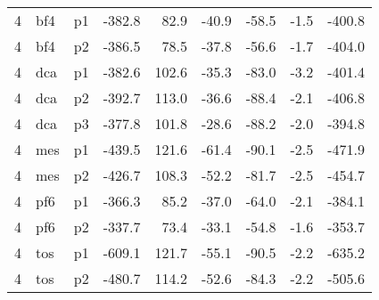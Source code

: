 \documentclass[a4paper]{article}
\begin{document}
\begin{table}[ht]
\begin{tabular}{rllrrrrrr}
   4 & bf4 & p1 & -382.8 & 82.9 & -40.9 & -58.5 & -1.5 & -400.8 \\ 
   4 & bf4 & p2 & -386.5 & 78.5 & -37.8 & -56.6 & -1.7 & -404.0 \\ 
   4 & dca & p1 & -382.6 & 102.6 & -35.3 & -83.0 & -3.2 & -401.4 \\ 
   4 & dca & p2 & -392.7 & 113.0 & -36.6 & -88.4 & -2.1 & -406.8 \\ 
   4 & dca & p3 & -377.8 & 101.8 & -28.6 & -88.2 & -2.0 & -394.8 \\ 
   4 & mes & p1 & -439.5 & 121.6 & -61.4 & -90.1 & -2.5 & -471.9 \\ 
   4 & mes & p2 & -426.7 & 108.3 & -52.2 & -81.7 & -2.5 & -454.7 \\ 
   4 & pf6 & p1 & -366.3 & 85.2 & -37.0 & -64.0 & -2.1 & -384.1 \\ 
   4 & pf6 & p2 & -337.7 & 73.4 & -33.1 & -54.8 & -1.6 & -353.7 \\ 
   4 & tos & p1 & -609.1 & 121.7 & -55.1 & -90.5 & -2.2 & -635.2 \\ 
   4 & tos & p2 & -480.7 & 114.2 & -52.6 & -84.3 & -2.2 & -505.6 \\ 
   \hline
\end{tabular}
\end{table}
\end{document}
